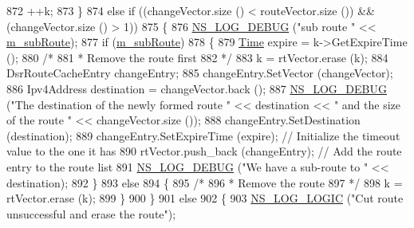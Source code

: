 \begin{DoxyCode}
872                   ++k;
873                 \}
874               \textcolor{keywordflow}{else} \textcolor{keywordflow}{if} ((changeVector.size () < routeVector.size ()) && (changeVector.size () > 1))
875                 \{
876                   \hyperlink{group__logging_ga413f1886406d49f59a6a0a89b77b4d0a}{NS\_LOG\_DEBUG} (\textcolor{stringliteral}{"sub route "} << \hyperlink{classns3_1_1dsr_1_1DsrRouteCache_aea55a575fdabc0a2cdf7cde483549d1f}{m\_subRoute});
877                   \textcolor{keywordflow}{if} (\hyperlink{classns3_1_1dsr_1_1DsrRouteCache_aea55a575fdabc0a2cdf7cde483549d1f}{m\_subRoute})
878                     \{
879                       \hyperlink{namespacens3_1_1TracedValueCallback_a7ffd3e7c142ffe7c8a1d2db9b8de38ec}{Time} expire = k->GetExpireTime ();
880                       \textcolor{comment}{/*}
881 \textcolor{comment}{                       * Remove the route first}
882 \textcolor{comment}{                       */}
883                       k = rtVector.erase (k);
884                       DsrRouteCacheEntry changeEntry;
885                       changeEntry.SetVector (changeVector);
886                       Ipv4Address destination = changeVector.back ();
887                       \hyperlink{group__logging_ga413f1886406d49f59a6a0a89b77b4d0a}{NS\_LOG\_DEBUG} (\textcolor{stringliteral}{"The destination of the newly formed route "} << destination
       << \textcolor{stringliteral}{" and the size of the route "} << changeVector.size ());
888                       changeEntry.SetDestination (destination);
889                       changeEntry.SetExpireTime (expire); \textcolor{comment}{// Initialize the timeout value to the one it has}
890                       rtVector.push\_back (changeEntry);  \textcolor{comment}{// Add the route entry to the route list}
891                       \hyperlink{group__logging_ga413f1886406d49f59a6a0a89b77b4d0a}{NS\_LOG\_DEBUG} (\textcolor{stringliteral}{"We have a sub-route to "} << destination);
892                     \}
893                   \textcolor{keywordflow}{else}
894                     \{
895                       \textcolor{comment}{/*}
896 \textcolor{comment}{                       * Remove the route}
897 \textcolor{comment}{                       */}
898                       k = rtVector.erase (k);
899                     \}
900                 \}
901               \textcolor{keywordflow}{else}
902                 \{
903                   \hyperlink{group__logging_ga88acd260151caf2db9c0fc84997f45ce}{NS\_LOG\_LOGIC} (\textcolor{stringliteral}{"Cut route unsuccessful and erase the route"});

\end{DoxyCode}
